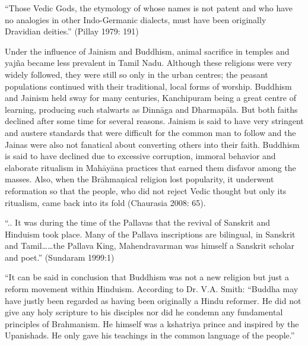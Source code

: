 \begin{myquote}
“Those Vedic Gods, the etymology of whose names is not patent and who have no analogies in other Indo-Germanic dialects, must have been originally Dravidian deities.” (Pillay 1979: 191)
\end{myquote}

Under the influence of Jainism and Buddhism, animal sacrifice in temples and yajña became less prevalent in Tamil Nadu. Although these religions were very widely followed, they were still so only in the urban centres; the peasant populations continued with their traditional, local forms of worship. Buddhism and Jainism held sway for many centuries, Kanchipuram being a great centre of learning, producing such stalwarts as Dinnāga and Dharmapāla. But both faiths declined after some time for several reasons. Jainism is said to have very stringent and austere standards that were difficult for the common man to follow and the Jainas were also not fanatical about converting others into their faith. Buddhism is said to have declined due to excessive corruption, immoral behavior and elaborate ritualism in Mahāyāna practices that earned them disfavor among the masses. Also, when the Brāhmaņical religion lost popularity, it underwent reformation so that the people, who did not reject Vedic thought but only its ritualism, came back into its fold (Chaurasia 2008: 65).

\vskip 2pt

\begin{myquote}
“.. It was during the time of the Pallavas that the revival of Sanskrit and Hinduism took place. Many of the Pallava inscriptions are bilingual, in Sanskrit and Tamil……the Pallava King, Mahendravarman was himself a Sanskrit scholar and poet.” (Sundaram 1999:1)
\end{myquote}

\vskip 2pt

\begin{myquote}
“It can be said in conclusion that Buddhism was not a new religion but just a reform movement within Hinduism. According to Dr. V.A. Smith: “Buddha may have justly been regarded as having been originally a Hindu reformer. He did not give any holy scripture to his disciples nor did he condemn any fundamental principles of Brahmanism. He himself was a kshatriya prince and inspired by the Upanishads. He only gave his teachings in the common language of the people.”
\end{myquote}

